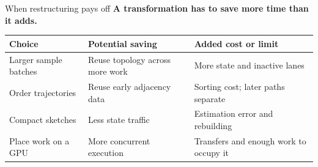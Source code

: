 \documentclass[10pt,aspectratio=169]{beamer}
\begin{document}
\begin{frame}{When restructuring pays off}
\setlength{\parskip}{0pt}
\textbf{A transformation has to save more time than it adds.}\par
\vspace{0.28cm}
{\small\renewcommand{\arraystretch}{1.45}
\begin{tabular}{@{}>{\raggedright\arraybackslash}p{3.2cm}>{\raggedright\arraybackslash}p{5.1cm}>{\raggedright\arraybackslash}p{5.1cm}@{}}
\toprule\textbf{Choice} & \textbf{Potential saving} & \textbf{Added cost or limit}\\\midrule
Larger sample batches & Reuse topology across more work & More state and inactive lanes\\
Order trajectories & Reuse early adjacency data & Sorting cost; later paths separate\\
Compact sketches & Less state traffic & Estimation error and rebuilding\\
Place work on a GPU & More concurrent execution & Transfers and enough work to occupy it\\\bottomrule
\end{tabular}\par}
\end{frame}
\end{document}
